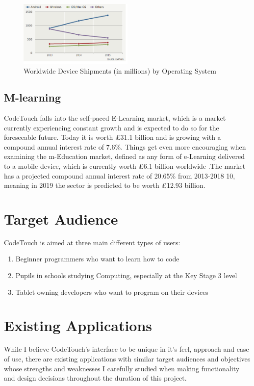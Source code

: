 \documentclass[ %
                    author={Jonathan Rankin},
                supervisor={Dr. David May, Dr. Ian Holyer},
                    degree={MEng},
                     title={CodeTouch},
                  subtitle={A Revolutionary Way To Program Real Code On Touch Screen Devices},
                      type={enterprise},
                      year={2015 } ]{dissertation}
\begin{document}
\begin{figure}[h]
\centering
\includegraphics[width=0.50\textwidth]{android}\caption{Worldwide Device Shipments (in millions) by Operating System \cite{tabletOvertake}}
\label{fig:android}
\end{figure}


 

\subsection{M-learning}


CodeTouch falls into the self-paced E-Learning market, which is a market currently experiencing constant growth and is expected to do so for the foreseeable future. Today it is worth £31.1 billion and is growing with a compound annual interest rate of 7.6\%.
Things get even more encouraging when examining the m-Education market, defined as any form of e-Learning delivered to a mobile device, which is currently worth £6.1 billion worldwide .The market has a projected compound annual interest rate of 20.65\% from 2013-2018 10, meaning in 2019 the sector is predicted to be worth £12.93 billion.


\section{Target Audience}
CodeTouch is aimed at three main different types of users:
\begin{enumerate}
\item Beginner programmers who want to learn how to code
\item Pupils in schools studying Computing, especially at the Key Stage 3 level
\item Tablet owning developers who want to program on their devices
\end{enumerate}

\section{Existing Applications }
While I believe CodeTouch's interface to be unique in it's feel, approach and ease of use, there are existing applications with similar target audiences and objectives whose strengths and weaknesses I carefully studied when making functionality and design decisions throughout the duration of this project. 
\end{document}
